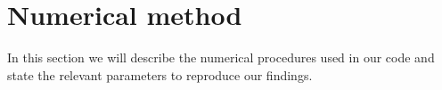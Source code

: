 \section{Numerical method}
In this section we will describe the numerical procedures used in our code and state the relevant parameters to reproduce our findings.

\newpage

\newpage

